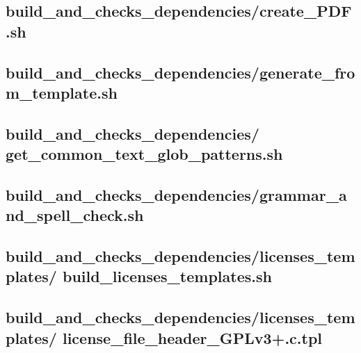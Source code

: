 \documentclass{article}
\begin{document}
\subsection{
  build\_and\_checks\_dependencies/create\_PDF.sh
}
\label{
  build_and_checks_dependencies:create_PDFsh
}



\subsection{
  build\_and\_checks\_dependencies/generate\_from\_template.sh
}
\label{
  build_and_checks_dependencies:generate_from_templatesh
}



\subsection{
  build\_and\_checks\_dependencies/%
get\_common\_text\_glob\_patterns.sh
}
\label{
  build_and_checks_dependencies:get_common_text_glob_patternssh
}



\subsection{
  build\_and\_checks\_dependencies/grammar\_and\_spell\_check.sh
}
\label{
  build_and_checks_dependencies:grammar_and_spell_checksh
}



\subsection{
  build\_and\_checks\_dependencies/licenses\_templates/%
build\_licenses\_templates.sh
}
\label{
  build_and_checks_dependencies:licenses_templates:%
build_licenses_templatessh
}



\subsection{
  build\_and\_checks\_dependencies/licenses\_templates/%
license\_file\_header\_GPLv3+.c.tpl
}
\label{
  build_and_checks_dependencies:licenses_templates:%
license_file_header_GPLv3+ctpl
}
\end{document}
